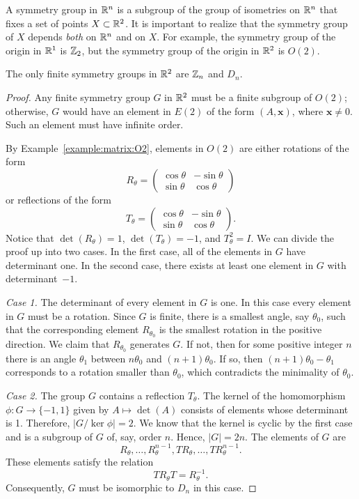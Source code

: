  
A {\bfi symmetry group\/} in ${\Bbb R}^n$ is a
subgroup of the group of isometries on ${\Bbb R}^n$ that fixes a set
of points $X \subset {\Bbb R}^2$.  It is important to realize that the
symmetry group of $X$ depends {\em both\/} on ${\Bbb R}^n$ and on
$X$. For example, the symmetry group of the origin in ${\Bbb R}^1$ is
${\Bbb Z}_2$, but the symmetry group of the origin in ${\Bbb R}^2$ is
$O(2)$. 
 
 
\begin{theorem}
The only finite symmetry groups in ${\Bbb R}^2$ are ${\Bbb Z}_n$ and
$D_n$. 
\end{theorem}
 
 
\begin{proof}
Any finite symmetry group $G$ in ${\Bbb R}^2$ must be a finite
subgroup of $O(2)$; otherwise, $G$ would have an element in $E(2)$ of
the form $(A, {\mathbf x})$, where ${\mathbf x} \neq 0$.  Such an element
must have infinite order. 
 
 
By Example~\ref{example:matrix:O2}, elements in $O(2)$ are either rotations of the form
\[
R_{\theta}
=
\begin{pmatrix}
\cos \theta & - \sin \theta \\
\sin \theta & \cos \theta
\end{pmatrix}
\]
or reflections of the form
\[T_{\theta}
=
\begin{pmatrix}
\cos \theta & - \sin \theta \\
\sin \theta & \cos \theta
\end{pmatrix}.
\]
Notice that $\det(R_{\theta})=1$,  $\det(T_{\theta})=-1$,
and $T_{\theta}^2=I$. We can divide the proof up into two cases.  In
the first case, all of the elements in $G$ have determinant one. In the
second case, there exists at least one element in $G$ with 
determinant~$-1$.  
 
 
{\em Case 1.}  
The determinant of every element in $G$ is one. In this case every
element in $G$ must be a rotation. Since $G$ is finite, there is a
smallest angle, say $\theta_0$, such that the corresponding element
$R_{\theta_0}$ is the smallest rotation in the positive direction.  We
claim that $R_{\theta_0}$ generates $G$.  If not, then for some
positive integer $n$ there is an angle $\theta_1$ between $n \theta_0$
and $(n+1) \theta_0$. If so, then $(n+1) \theta_0 - \theta_1$
corresponds to a rotation smaller than $\theta_0$, which contradicts
the minimality of $\theta_0$.   
 
 
 
{\em Case 2.}  
The group $G$ contains a reflection $T_{\theta}$.  The kernel of the
homomorphism $\phi : G \rightarrow \{-1, 1\}$ given by $A \mapsto
\det(A)$ consists of elements whose determinant is 1.  Therefore, $|G/
\ker \phi|=2$.  We know that the kernel is cyclic by the first case
and is a subgroup of $G$ of, say, order $n$. Hence, $|G| = 2n$. The
elements of $G$ are
\[
R_{\theta}, \ldots, R_{\theta}^{n-1},  TR_{\theta}, \ldots,
TR_{\theta}^{n-1}.
\]
These elements satisfy the relation
\[
TR_{\theta}T = R_{\theta}^{-1}.
\]
Consequently, $G$ must be isomorphic to $D_n$ in this case.
\end{proof}
 
